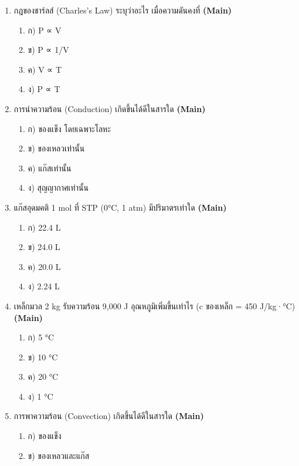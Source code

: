 \documentclass[12pt]{article}
\begin{document}
\begin{enumerate}[label=\arabic*.]
\begin{enumerate}[label=)]
\item ก) P ∝ V
\item ข) P ∝ 1/V
\item ค) P ∝ T
\item ง) V ∝ T
\end{enumerate}
\item กฎของชาร์ลส์ (Charles's Law) ระบุว่าอะไร เมื่อความดันคงที่ \hfill \textbf{\small (Main)}
\begin{enumerate}[label=)]
\item ก) P ∝ V
\item ข) P ∝ 1/V
\item ค) V ∝ T
\item ง) P ∝ T
\end{enumerate}
\item การนำความร้อน (Conduction) เกิดขึ้นได้ดีในสารใด \hfill \textbf{\small (Main)}
\begin{enumerate}[label=)]
\item ก) ของแข็ง โดยเฉพาะโลหะ
\item ข) ของเหลวเท่านั้น
\item ค) แก๊สเท่านั้น
\item ง) สุญญากาศเท่านั้น
\end{enumerate}
\item แก๊สอุดมคติ 1 mol ที่ STP (0°C, 1 atm) มีปริมาตรเท่าใด \hfill \textbf{\small (Main)}
\begin{enumerate}[label=)]
\item ก) 22.4 L
\item ข) 24.0 L
\item ค) 20.0 L
\item ง) 2.24 L
\end{enumerate}
\item เหล็กมวล 2 kg รับความร้อน 9,000 J อุณหภูมิเพิ่มขึ้นเท่าไร (c ของเหล็ก = 450 J/kg·°C) \hfill \textbf{\small (Main)}
\begin{enumerate}[label=)]
\item ก) 5 °C
\item ข) 10 °C
\item ค) 20 °C
\item ง) 1 °C
\end{enumerate}
\item การพาความร้อน (Convection) เกิดขึ้นได้ดีในสารใด \hfill \textbf{\small (Main)}
\begin{enumerate}[label=)]
\item ก) ของแข็ง
\item ข) ของเหลวและแก๊ส

\end{enumerate}
\end{enumerate}
\end{document}
